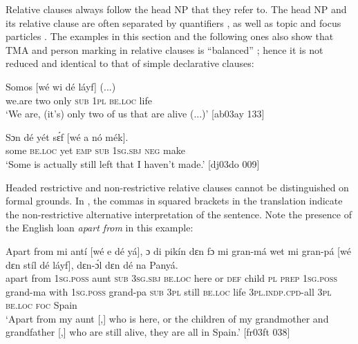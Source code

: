Relative clauses always follow the head \textsc{NP} that they refer to. The head \textsc{NP} and its relative clause are often separated by quantifiers , as well as topic and focus particles . The examples in this section and the following ones also show that TMA and person marking in relative clauses is “balanced” \citep{Stassen1985}; hence it is not reduced and identical to that of simple declarative clauses:



\ea%
    \label{ex:key:1422}
    \gll Somos      [wé  wi  dé    láyf]    (...)\\
we.are  two  only     \textsc{sub}  \textsc{1pl}  \textsc{be.loc}  life\\

\glt ‘We are, (it’s) only two of us that are alive (...)’ [ab03ay 133]
\z


\ea%
    \label{ex:key:1423}
    \gll Sɔn    dé    yét  sɛ́f  [wé  a    nó  mék].\\
some  \textsc{be.loc}  yet  \textsc{emp}   \textsc{sub}  \textsc{1sg.sbj}  \textsc{neg}  make\\

\glt ‘Some is actually still left that I haven’t made.’ [dj03do 009]
\z

Headed restrictive and non-restrictive relative clauses cannot be distinguished on formal grounds. In , the commas in squared brackets in the translation indicate the non-restrictive alternative interpretation of the sentence. Note the presence of the English loan \textit{apart from} in this example: 


\ea%
    \label{ex:key:1424}
    \gll Apart  from  mi    antí    [wé  e    dé    yá],    ɔ  di  pikín
dɛn  fɔ  mi    gran-má    wet    mi    gran-pá    [wé  dɛn  stíl  dé
láyf],  dɛn-ɔ́l      dɛn  dé    na  Panyá.\\
apart  from  \textsc{1sg.poss}  aunt     \textsc{sub}  \textsc{3sg.sbj}  \textsc{be.loc}  here    or  \textsc{def}  child
\textsc{pl}  \textsc{prep}  \textsc{1sg.poss}  grand-ma  with    \textsc{1sg.poss}  grand-pa     \textsc{sub}  \textsc{3pl}  still  \textsc{be.loc}
life     \textsc{3pl.indp.cpd-}all  \textsc{3pl}  \textsc{be.loc}  \textsc{foc}  Spain\\

\glt ‘Apart from my aunt [,] who is here, or the children of my grandmother and grandfather
[,] who are still alive, they are all in Spain.’ [fr03ft 038]
\z

